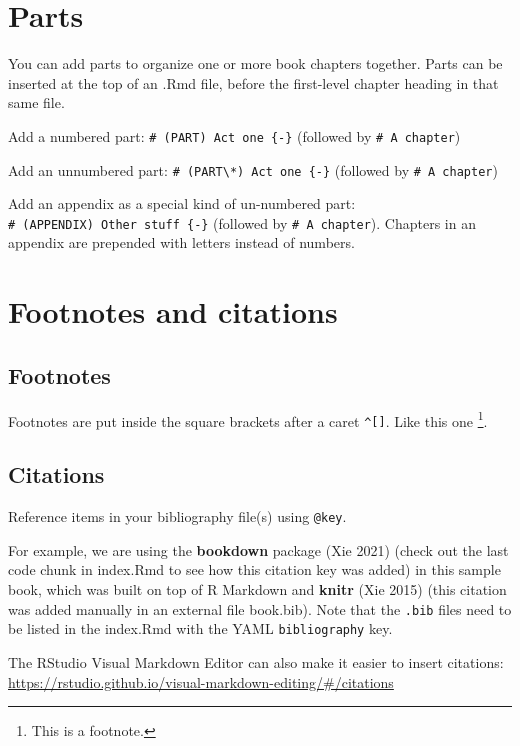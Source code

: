 \documentclass[12pt, oneside, openright]{byuthesis}
\begin{document}
\hypertarget{parts}{%
\chapter{Parts}\label{parts}}

You can add parts to organize one or more book chapters together. Parts can be inserted at the top of an .Rmd file, before the first-level chapter heading in that same file.

Add a numbered part: \texttt{\#\ (PART)\ Act\ one\ \{-\}} (followed by \texttt{\#\ A\ chapter})

Add an unnumbered part: \texttt{\#\ (PART\textbackslash{}*)\ Act\ one\ \{-\}} (followed by \texttt{\#\ A\ chapter})

Add an appendix as a special kind of un-numbered part: \texttt{\#\ (APPENDIX)\ Other\ stuff\ \{-\}} (followed by \texttt{\#\ A\ chapter}). Chapters in an appendix are prepended with letters instead of numbers.

\hypertarget{footnotes-and-citations}{%
\chapter{Footnotes and citations}\label{footnotes-and-citations}}

\hypertarget{footnotes}{%
\section{Footnotes}\label{footnotes}}

Footnotes are put inside the square brackets after a caret \texttt{\^{}{[}{]}}. Like this one \footnote{This is a footnote.}.

\hypertarget{citations}{%
\section{Citations}\label{citations}}

Reference items in your bibliography file(s) using \texttt{@key}.

For example, we are using the \textbf{bookdown} package (Xie 2021) (check out the last code chunk in index.Rmd to see how this citation key was added) in this sample book, which was built on top of R Markdown and \textbf{knitr} (Xie 2015) (this citation was added manually in an external file book.bib).
Note that the \texttt{.bib} files need to be listed in the index.Rmd with the YAML \texttt{bibliography} key.

The RStudio Visual Markdown Editor can also make it easier to insert citations: \url{https://rstudio.github.io/visual-markdown-editing/\#/citations}
\end{document}
